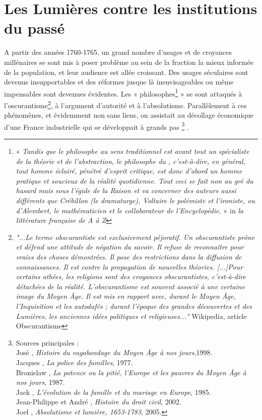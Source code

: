 

\chapter{Les Lumières contre les institutions du passé}


 A partir des années 1760-1765, un grand nombre d'usages et de croyances millénaires se sont mis à poser problème au sein de la fraction la mieux informée de la population, et leur audience est allée croissant. Des usages séculaires sont devenus insupportables et des réformes jusque là inenvisageables ou même impensables sont devenues évidentes. Les « philosophes\footnote{« \emph{Tandis que le philosophe au sens traditionnel est avant tout un spécialiste de la théorie et de l'abstraction, le philosophe du , c'est-à-dire, en général, tout homme éclairé, pénétré d'esprit critique, est donc d'abord un homme pratique et soucieux de la réalité quotidienne. Tout ceci se fait non au gré du hasard mais sous l'égide de la Raison et va concerner des auteurs aussi différents que Crébillon (le dramaturge), Voltaire le polémiste et l'ironiste, ou d'Alembert, le mathématicien et le collaborateur de l'Encyclopédie.} » in \emph{la littérature française de A à Z}} » se sont attaqués à l'oscurantisme\footnote{\emph{"...Le terme obscurantiste est exclusivement péjoratif. Un obscurantiste prône et défend une attitude de négation du savoir. Il refuse de reconnaître pour vraies des choses démontrées. Il pose des restrictions dans la diffusion de connaissances. Il est contre la propagation de nouvelles théories.
[...]Pour certains athées, les religions sont des croyances obscurantistes, c'est-à-dire détachées de la réalité.
L'obscurantisme est souvent associé à une certaine image du Moyen Âge. Il est mis en rapport avec, durant le Moyen Âge, l'Inquisition et les autodafés ; durant l'époque des grandes découvertes et des Lumières, les anciennes idées politiques et religieuses..."} Wikipedia, article Obscurantisme}, à l'argument d'autorité et à l'absolutisme.  Parallèlement à ces phénomènes, et évidemment non sans liens,  on assistait au décollage économique d'une France industrielle qui se développait à grands pas%
\footnote{Sources principales :
\\José , \emph{Histoire du vagabondage du Moyen Âge à nos jours},1998.
\\Jacques {}, \emph{La police des familles}, 1977.
\\Bronislaw {}, \emph{La potence ou la pitié, l'Europe et les pauvres du Moyen Âge à nos jours}, 1987.
\\Jack {}, \emph{L'évolution de la famille et du mariage en Europe}, 1985.
\\Jean-Philippe  et André , \emph{Histoire du droit civil}, 2002.
\\Joel {}, \emph{Absolutisme et lumière, 1653-1783}, 2005. }%
.


